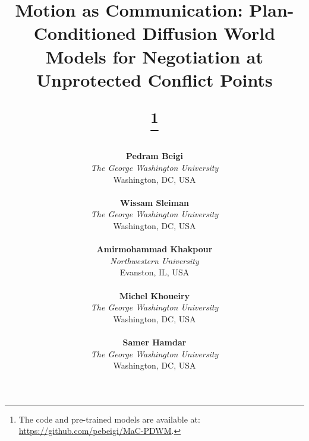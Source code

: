 \documentclass[conference]{IEEEtran}
\begin{document}
\title{Motion as Communication: Plan-Conditioned Diffusion World Models for Negotiation at Unprotected Conflict Points

\thanks{
The code and pre-trained models are available at: \url{https://github.com/pebeigi/MaC-PDWM}.}}

\author{
\begin{minipage}{\textwidth}
\centering
\vspace{0.8em}

\begin{minipage}[t]{0.31\textwidth}
\centering
\textbf{Pedram Beigi}\\
\textit{The George Washington University}\\
Washington, DC, USA\\
\end{minipage}
\hfill
\begin{minipage}[t]{0.31\textwidth}
\centering
\textbf{Wissam Sleiman}\\
\textit{The George Washington University}\\
Washington, DC, USA\\
\end{minipage}
\hfill
\begin{minipage}[t]{0.31\textwidth}
\centering
\textbf{Amirmohammad Khakpour}\\
\textit{Northwestern University}\\
Evanston, IL, USA\\
\end{minipage}

\vspace{1.3em}

\begin{minipage}{0.65\textwidth}
\centering
\begin{minipage}[t]{0.47\textwidth}
\centering
\textbf{Michel Khoueiry}\\
\textit{The George Washington University}\\
Washington, DC, USA\\
\end{minipage}
\hfill
\begin{minipage}[t]{0.47\textwidth}
\centering
\textbf{Samer Hamdar}\\
\textit{The George Washington University}\\
Washington, DC, USA\\
\end{minipage}
\end{minipage}

\vspace{0.4em}
\end{minipage}
}
\end{document}
